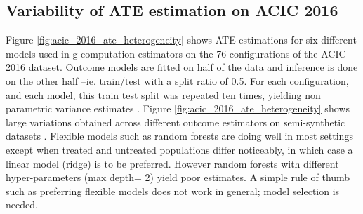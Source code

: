 \documentclass[a4paper,num-refs]{oup-contemporary}%
\begin{document}



\subsection{Variability of ATE estimation on ACIC
    2016}\label{apd:toy_example:acic_2016_ate_variability}

Figure \ref{fig:acic_2016_ate_heterogeneity} shows ATE estimations for six
different models used in g-computation estimators on the 76 configurations of
the ACIC 2016 dataset. Outcome models are fitted on half of the data and
inference is done on the other half --ie. train/test with a split ratio of 0.5.
For each configuration, and each model, this train test split was repeated ten
times, yielding non parametric variance estimates
\cite{bouthillier_accounting_2021}. Figure \ref{fig:acic_2016_ate_heterogeneity}
shows large variations obtained across different outcome estimators on
semi-synthetic datasets \cite{dorie_automated_2019}. Flexible models such as
random forests are doing well in most settings except when treated and untreated
populations differ noticeably, in which case a linear model (ridge) is to be
preferred. However random forests with different hyper-parameters (max depth= 2)
yield poor estimates. A simple rule of thumb such as preferring flexible models
does not work in general; model selection is needed.

\end{document}
